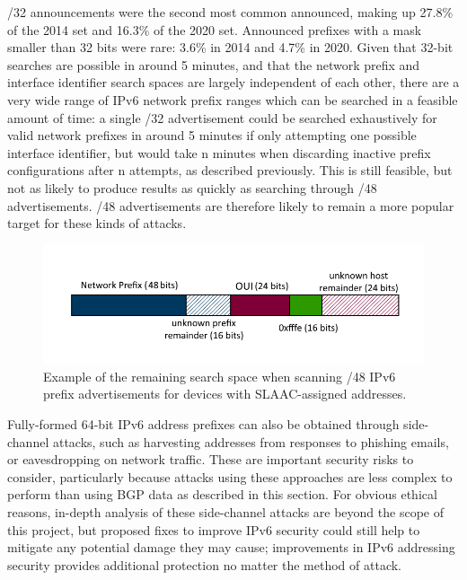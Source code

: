 \documentclass[10pt,sigconf]{acmart}
\begin{document}
/32 announcements were the second most common announced, making up 27.8\% of the 2014 set and 16.3\% of the 2020 set.
Announced prefixes with a mask smaller than 32 bits were rare:
3.6\% in 2014 and 4.7\% in 2020.
Given that 32-bit searches are possible in around 5 minutes, and that the network prefix and interface identifier search spaces are largely independent of each other, there are a very wide range of IPv6 network prefix ranges which can be searched in a feasible amount of time:
a single /32 advertisement could be searched exhaustively for valid network prefixes in around 5 minutes if only attempting one possible interface identifier, but would take n minutes when discarding inactive prefix configurations after n attempts, as described previously.
This is still feasible, but not as likely to produce results as quickly as searching through /48 advertisements.
/48 advertisements are therefore likely to remain a more popular target for these kinds of attacks.


\begin{figure}
\centering
        \includegraphics[totalheight=8cm]{ipv6addr.png}
    \caption{Example of the remaining search space when scanning /48 IPv6 prefix advertisements for devices with SLAAC-assigned addresses.}
    \label{ipv6addr}
\end{figure}

Fully-formed 64-bit IPv6 address prefixes can also be obtained through side-channel attacks, such as harvesting addresses from responses to phishing emails, or eavesdropping on network traffic.
These are important security risks to consider, particularly because attacks using these approaches are less complex to perform than using BGP data as described in this section.
For obvious ethical reasons, in-depth analysis of these side-channel attacks are beyond the scope of this project, but proposed fixes to improve IPv6 security could still help to mitigate any potential damage they may cause;
improvements in IPv6 addressing security provides additional protection no matter the method of attack.
\end{document}
